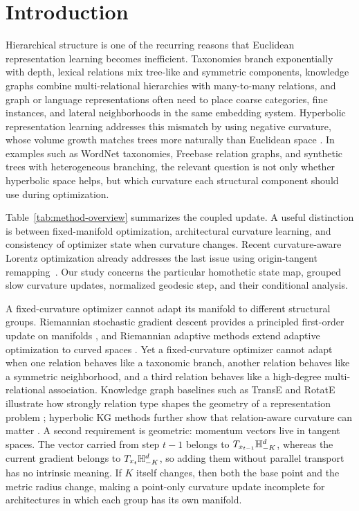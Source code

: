 \section{Introduction}

Hierarchical structure is one of the recurring reasons that Euclidean representation learning becomes inefficient. Taxonomies branch exponentially with depth, lexical relations mix tree-like and symmetric components, knowledge graphs combine multi-relational hierarchies with many-to-many relations, and graph or language representations often need to place coarse categories, fine instances, and lateral neighborhoods in the same embedding system. Hyperbolic representation learning addresses this mismatch by using negative curvature, whose volume growth matches trees more naturally than Euclidean space \citep{nickel2017poincare,nickel2018lorentz,chami2019hgcn,tifrea2019poincare,balazevic2019poincare}. In examples such as WordNet taxonomies, Freebase relation graphs, and synthetic trees with heterogeneous branching, the relevant question is not only whether hyperbolic space helps, but which curvature each structural component should use during optimization.



Table~\ref{tab:method-overview} summarizes the coupled update. A useful distinction is between fixed-manifold optimization, architectural curvature learning, and consistency of optimizer state when curvature changes. Recent curvature-aware Lorentz optimization already addresses the last issue using origin-tangent remapping~\citep{bdeir2025robust}. Our study concerns the particular homothetic state map, grouped slow curvature updates, normalized geodesic step, and their conditional analysis.


A fixed-curvature optimizer cannot adapt its manifold to different structural groups. Riemannian stochastic gradient descent provides a principled first-order update on manifolds \citep{bonnabel2013sgd,zhang2016geodesic}, and Riemannian adaptive methods extend adaptive optimization to curved spaces \citep{becigneul2019radam}. Yet a fixed-curvature optimizer cannot adapt when one relation behaves like a taxonomic branch, another relation behaves like a symmetric neighborhood, and a third relation behaves like a high-degree multi-relational association. Knowledge graph baselines such as TransE and RotatE illustrate how strongly relation type shapes the geometry of a representation problem \citep{bordes2013transe,sun2019rotate}; hyperbolic KG methods further show that relation-aware curvature can matter \citep{balazevic2019poincare}. A second requirement is geometric: momentum vectors live in tangent spaces. The vector carried from step $t-1$ belongs to $T_{x_{t-1}}\mathbb{H}^d_{-K}$, whereas the current gradient belongs to $T_{x_t}\mathbb{H}^d_{-K}$, so adding them without parallel transport has no intrinsic meaning. If $K$ itself changes, then both the base point and the metric radius change, making a point-only curvature update incomplete for architectures in which each group has its own manifold.

